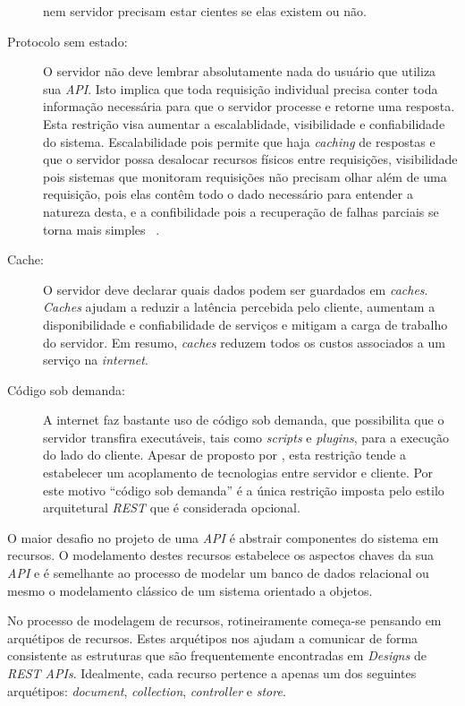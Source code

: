 \begin{description}
  nem servidor precisam estar cientes se elas existem ou não.
\item[Protocolo sem estado:] O servidor não deve lembrar absolutamente nada do usuário que 
  utiliza sua \emph{API}. Isto implica que toda requisição individual precisa conter toda 
  informação necessária para que o servidor processe e retorne uma resposta. Esta restrição 
  visa aumentar a escalablidade, visibilidade e confiabilidade do sistema. Escalabilidade pois 
  permite que haja \emph{caching} de respostas e que o servidor possa desalocar recursos 
  físicos entre requisições, visibilidade pois sistemas que monitoram requisições não 
  precisam olhar além de uma requisição, pois elas contêm todo o dado necessário 
  para entender a natureza desta, e a confibilidade pois a recuperação de falhas 
  parciais se torna mais simples \ \cite{kendall1994note}.
\item[Cache:] O servidor deve declarar quais dados podem ser guardados em \emph{caches}. 
  \emph{Caches} ajudam a reduzir a latência percebida pelo cliente, aumentam a disponibilidade 
  e confiabilidade de serviços e mitigam a carga de trabalho do servidor. Em resumo, 
  \emph{caches} reduzem todos os custos associados a um serviço na \emph{internet}.
\item[Código sob demanda:] A internet faz bastante uso de código sob demanda, que possibilita 
  que o servidor transfira executáveis, tais como \emph{scripts} e \emph{plugins}, para a 
  execução do lado do cliente. Apesar de proposto por , 
  esta restrição tende a estabelecer um acoplamento de tecnologias entre servidor e cliente. 
  Por este motivo ``código sob demanda'' é a única restrição imposta pelo estilo arquitetural 
  \emph{REST} que é considerada opcional.
\end{description}

O maior desafio no projeto de uma \emph{API} é abstrair componentes do sistema
em recursos. O modelamento destes recursos estabelece os aspectos chaves da sua \emph{API}
e é semelhante ao processo de modelar um banco de dados relacional ou mesmo o modelamento 
clássico de um sistema orientado a objetos.

No processo de modelagem de recursos, rotineiramente começa-se pensando em arquétipos de 
recursos. Estes arquétipos nos ajudam a comunicar de forma consistente 
as estruturas que são frequentemente encontradas em \emph{Designs} de \emph{REST APIs}.
Idealmente, cada recurso pertence a apenas um dos seguintes arquétipos: \emph{document}, 
\emph{collection}, \emph{controller} e \emph{store}.

